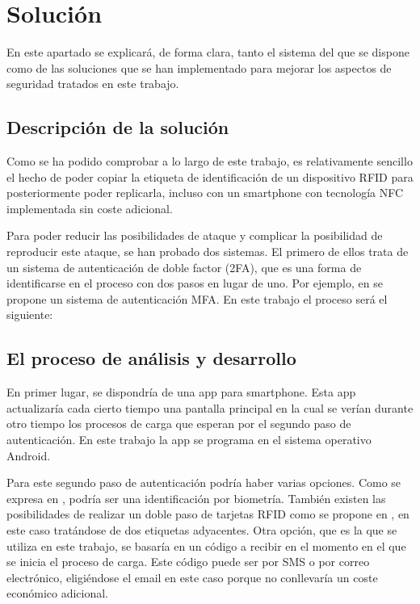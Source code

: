 \documentclass[12pt,a4paper,onecolumn,oneside]{report}
\begin{document}
\chapter{Solución}
\label{Solución}

En este apartado se explicará, de forma clara, tanto el sistema del que se dispone como de las soluciones que se han implementado para mejorar los aspectos de seguridad tratados en este trabajo. 

\section{Descripción de la solución}

Como se ha podido comprobar a lo largo de este trabajo, es relativamente sencillo el hecho de poder copiar la etiqueta de identificación de un dispositivo RFID para posteriormente poder replicarla, incluso con un smartphone con tecnología NFC implementada sin coste adicional.

Para poder reducir las posibilidades de ataque y complicar la posibilidad de reproducir este ataque, se han probado dos sistemas. 
El primero de ellos trata de un sistema de autenticación de doble factor (2FA), que es una forma de identificarse en el proceso con dos pasos en lugar de uno. Por ejemplo, en \cite{eados} se propone un sistema de autenticación MFA. En este trabajo el proceso será el siguiente:

\section{El proceso de análisis y desarrollo}

En primer lugar, se dispondría de una app para smartphone. Esta app actualizaría cada cierto tiempo una pantalla principal en la cual se verían durante otro tiempo los procesos de carga que esperan por el segundo paso de autenticación. En este trabajo la app se programa en el sistema operativo Android.

Para este segundo paso de autenticación podría haber varias opciones. Como se expresa en \cite{eatrece}, podría ser una identificación por biometría. También existen las posibilidades de realizar un doble paso de tarjetas RFID como se propone en \cite{eacinco}, en este caso tratándose de dos etiquetas adyacentes. Otra opción, que es la que se utiliza en este trabajo, se basaría en un código a recibir en el momento en el que se inicia el proceso de carga. Este código puede ser por SMS o por correo electrónico, eligiéndose el email en este caso porque no conllevaría un coste económico adicional.
\end{document}
